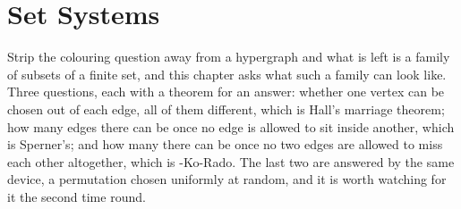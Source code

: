 \chapter{Set Systems} \label{Ch3:CH}
\thispagestyle{empty}

Strip the colouring question away from a hypergraph and what is left is a family of subsets of a finite set, and this chapter asks what such a family can look like. Three questions, each with a theorem for an answer: whether one vertex can be chosen out of each edge, all of them different, which is Hall's marriage theorem; how many edges there can be once no edge is allowed to sit inside another, which is Sperner's; and how many there can be once no two edges are allowed to miss each other altogether, which is \Erdos-Ko-Rado. The last two are answered by the same device, a permutation chosen uniformly at random, and it is worth watching for it the second time round.




